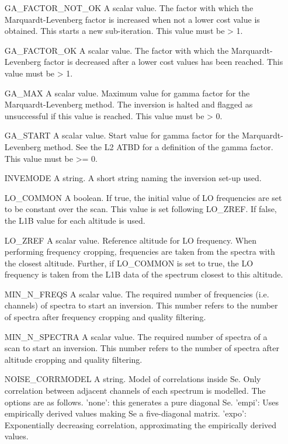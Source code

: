 \begin{changemargin}{2.5cm}{0.0cm}
\begin{itemize}
\item[{GA\_FACTOR\_NOT\_OK}] 
A scalar value. The factor with which the Marquardt-Levenberg factor is
increased when not a lower cost value is obtained. This starts a new
sub-iteration. This value must be > 1.

\item[{GA\_FACTOR\_OK}] 
A scalar value. The factor with which the Marquardt-Levenberg factor is
decreased after a lower cost values has been reached. This value must be > 1.

\item[{GA\_MAX}] 
A scalar value. Maximum value for gamma factor for the Marquardt-Levenberg
method. The inversion is halted and flagged as unsuccessful if this value is
reached. This value must be > 0.

\item[{GA\_START}] 
A scalar value. Start value for gamma factor for the Marquardt-Levenberg
method. See the L2 ATBD for a definition of the gamma factor. This value must
be >= 0.

\item[{INVEMODE}] 
A string. A short string naming the inversion set-up used.

\item[{LO\_COMMON}] 
A boolean. If true, the initial value of LO frequencies are set to be
constant over the scan. This value is set following LO\_ZREF. If false, the
L1B value for each altitude is used.


\item[{LO\_ZREF}] 
A scalar value. Reference altitude for LO frequency. When performing
frequency cropping, frequencies are taken from the spectra with the closest
altitude. Further, if LO\_COMMON is set to true, the LO frequency is taken
from the L1B data of the spectrum closest to this altitude.

\item[{MIN\_N\_FREQS}] 
A scalar value. The required number of frequencies (i.e. channels) of spectra
to start an inversion. This number refers to the number of spectra after frequency
cropping and quality filtering.

\item[{MIN\_N\_SPECTRA}] 
A scalar value. The required number of spectra of a scan to start an
inversion. This number refers to the number of spectra after altitude
cropping and quality filtering.

\item[{NOISE\_CORRMODEL}] 
A string. Model of correlations inside Se. Only correlation between adjacent
channels of each spectrum is modelled. The options are as follows. 'none':
this generates a pure diagonal Se. 'empi': Uses empirically derived values
making Se a five-diagonal matrix. 'expo': Exponentially decreasing
correlation, approximating the empirically derived values.


\end{itemize}
\end{changemargin}
